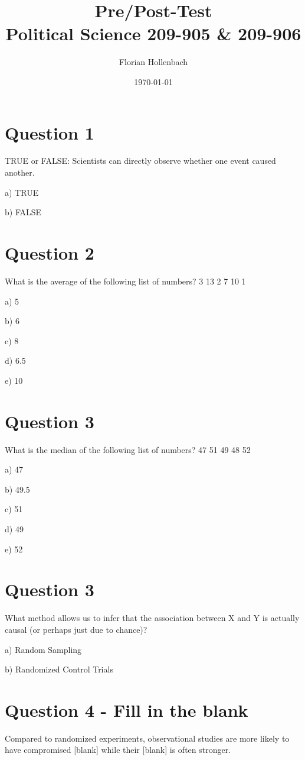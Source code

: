 \documentclass[11pt]{article}
\author{Florian Hollenbach}
\date{\today}
\title{Pre/Post-Test\\\medskip
\large Political Science 209-905 \& 209-906}
\begin{document}
\maketitle

\section*{Question 1}
\label{sec:org6c605f5}
TRUE or FALSE: Scientists can directly observe whether one event caused another.

a) TRUE

b) FALSE

\section*{Question 2}
\label{sec:orge562566}
What is the average of the following list of numbers? 3 13 2 7 10 1

a) 5

b) 6

c) 8

d) 6.5

e) 10


\section*{Question 3}
\label{sec:org6abfa3d}
What is the median of the following list of numbers? 47 51 49 48 52

a) 47

b) 49.5

c) 51

d) 49

e) 52


\section*{Question 3}
\label{sec:org33369bc}
What method allows us to infer that the association between X and Y is actually causal (or perhaps just due to chance)?

a) Random Sampling

b) Randomized Control Trials


\section*{Question 4 - Fill in the blank}
\label{sec:org8a1bd99}
Compared to randomized experiments, observational studies are more likely to have compromised [blank] while their [blank] is often stronger.
\end{document}
